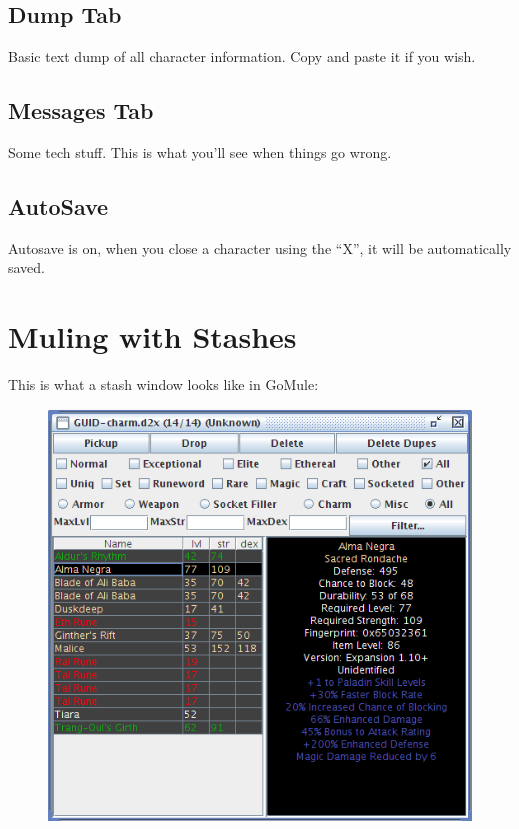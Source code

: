 \documentclass[a4paper,10pt]{article}
\begin{document}
\subsection{Dump Tab}

Basic text dump of all character information. Copy and paste it if you wish.

\subsection{Messages Tab}

Some tech stuff. This is what you'll see when things go wrong.

\subsection{AutoSave}

Autosave is on, when you close a character using the ``X'', it will be automatically saved.

\section{Muling with Stashes}

This is what a stash window looks like in GoMule:

\begin{figure}[htp]
\centering
 \includegraphics[width=140mm]{stash.png}
\end{figure}
\end{document}
